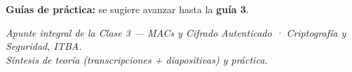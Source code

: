 \documentclass[11pt,a4paper]{article}
\begin{document}
\noindent\textbf{Guías de práctica:} se sugiere avanzar hasta la \textbf{guía 3}.

\vfill
\begin{center}\small\itshape\color{black!60}
Apunte integral de la Clase 3 — MACs y Cifrado Autenticado · Criptografía y Seguridad, ITBA.\\
Síntesis de teoría (transcripciones + diapositivas) y práctica.
\end{center}
\end{document}
